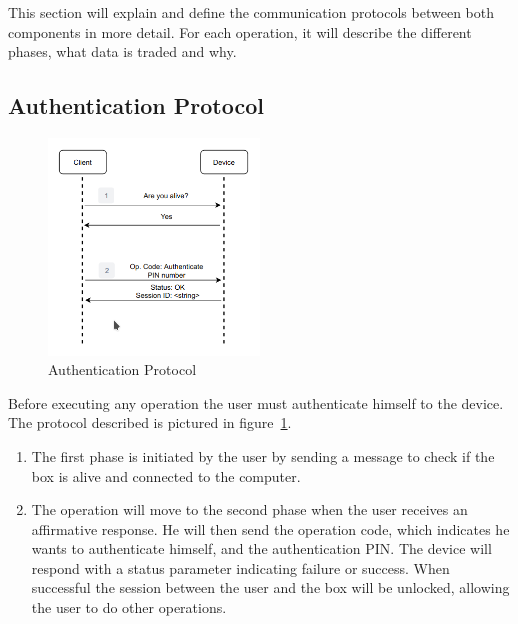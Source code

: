 This section will explain and define the communication protocols between both components in more detail. For each operation, it will describe the different phases, what data is traded and why.

\subsection{Authentication Protocol}\label{chap:solution:protocol:auth}

\begin{figure}[h]
	\centering
	\includegraphics[width=0.5\textwidth]{./Images/authentication.png}
	\caption{Authentication Protocol}
	\label{fig:protocol:authentication}
\end{figure}

Before executing any operation the user must authenticate himself to the device.
The protocol described is pictured in figure~\ref{fig:protocol:authentication}.

\begin{enumerate}
	\item The first phase is initiated by the user by sending a message to check if the box is alive and connected to the computer.
	\item The operation will move to the second phase when the user receives an affirmative response. He will then send the operation code, which indicates he wants to authenticate himself, and the authentication \ac{PIN}. The device will respond with a status parameter indicating failure or success. When successful the session between the user and the box will be unlocked, allowing the user to do other operations.
\end{enumerate}


